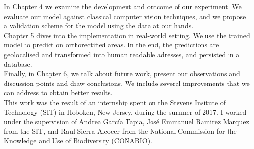 In Chapter 4 we examine the development and outcome of our experiment. We evaluate our model against classical computer vision techniques, and we propose a validation scheme for the model using the data at our hands.\\

Chapter 5 dives into the implementation in real-world setting. We use the trained model to predict on orthorectified areas. In the end, the predictions are geolocalised and transformed into human readable adresses, and persisted in a database.\\

Finally, in Chapter 6, we talk about future work, present our observations and discussion points and draw conclusions. We include several improvements that we can address to obtain better results.\\

This work was the result of an internship spent on the Stevens Insitute of Technology (SIT) in Hoboken, New Jersey, during the summer of 2017. I worked under the supervision of Andrea Garc\'ia Tapia, Jos\'e Emmanuel Ramirez Marquez from the SIT, and Raul Sierra Alcocer from the National Commission for the Knowledge and Use of Biodiversity (CONABIO).\\